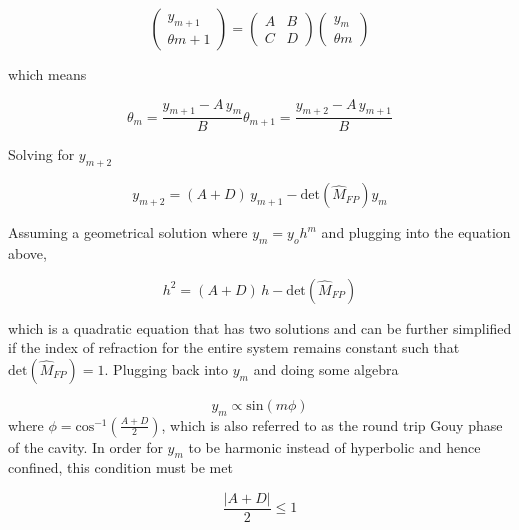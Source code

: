 \begin{appendices}
	\begin{equation}
	\begin{pmatrix} y_{m+1} 
	\\ \theta{m+1}
	\end{pmatrix}
	= 
	\begin{pmatrix}
		A	&B		
	\\ 	C	&D
	\end{pmatrix}
	\begin{pmatrix} y_{m} 
	\\ \theta{m}
	\end{pmatrix}
	\end{equation}
	
	which means
	
	\begin{subequations}
	\begin{equation}
	\theta_m = \frac{y_{m+1} - A \, y_m}{B}
	\end{equation}
	\begin{equation}
	\theta_{m+1} = \frac{y_{m+2} - A \, y_{m+1}}{B}
	\end{equation}
	\end{subequations}

	Solving for $y_{m+2}$
	
	\begin{equation}
	y_{m+2} = (A+D) \, y_{m+1} - \text{det}(\hat{M}_{FP}) y_m
	\end{equation}
	
	Assuming a geometrical solution where $y_m = y_o h^m$ and plugging into the equation above, 
	
	\begin{equation}
	h^2 = (A+D) \, h - \text{det}(\hat{M}_{FP})
	\end{equation}
	
	which is a quadratic equation that has two solutions and can be further simplified if the index of refraction for the entire system remains constant such that $\text{det}(\hat{M}_{FP}) =1 $.  Plugging back into $y_m$ and doing some algebra
	
	\begin{equation}
	y_m \propto \text{sin}(m \phi )
	\end{equation}
	where $\phi =\text{cos}^{-1} (\frac{A+D}{2})$, which is also referred to as the round trip Gouy phase of the cavity.  In order for $y_m$ to be harmonic instead of hyperbolic and hence confined, this condition must be met
	
	\begin{equation}
	\frac{\vert A+D \vert}{2} \leq 1
	\end{equation}
	

\end{appendices}
